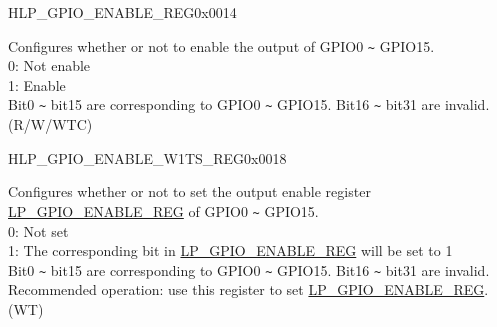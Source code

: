 \begin{register}{H}{LP\_GPIO\_ENABLE\_REG}{0x0014}\label{regdesc:LPGPIOENABLEREG}
%
%
\regnewline%
\begin{regdesc}\begin{reglist}
\label{fielddesc:LPGPIOENABLEDATA}\item [LP\_GPIO\_ENABLE\_DATA]  Configures whether or not to enable the output of GPIO0 \verb+~+ GPIO15.\\
0: Not enable\\
1: Enable\\
Bit0 \verb+~+ bit15 are corresponding to GPIO0 \verb+~+ GPIO15. Bit16 \verb+~+ bit31 are invalid.\\
(R/W/WTC)
\end{reglist}\end{regdesc}
\end{register}


\begin{register}{H}{LP\_GPIO\_ENABLE\_W1TS\_REG}{0x0018}\label{regdesc:LPGPIOENABLEW1TSREG}
%
%
\regnewline%
\begin{regdesc}\begin{reglist}
\label{fielddesc:LPGPIOENABLEDATAW1TS}\item [LP\_GPIO\_ENABLE\_DATA\_W1TS] Configures whether or not to set the output enable register \hyperref[regdesc:LPGPIOENABLEREG]{LP\_GPIO\_ENABLE\_REG} of GPIO0 \verb+~+ GPIO15.\\
0: Not set\\
1: The corresponding bit in \hyperref[regdesc:LPGPIOENABLEREG]{LP\_GPIO\_ENABLE\_REG} will be set to 1\\
Bit0 \verb+~+ bit15 are corresponding to GPIO0 \verb+~+ GPIO15. Bit16 \verb+~+ bit31 are invalid. Recommended operation: use this register to set \hyperref[regdesc:LPGPIOENABLEREG]{LP\_GPIO\_ENABLE\_REG}.\\
(WT)
\end{reglist}\end{regdesc}
\end{register}


